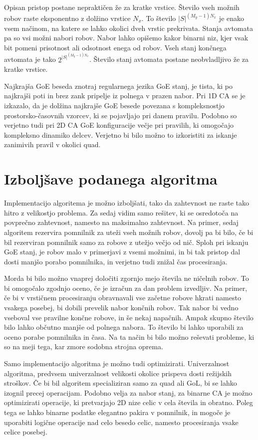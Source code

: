 \documentclass[12pt,a4paper,openany,twoside]{book}
\begin{document}
Opisan pristop postane nepraktičen že za kratke vrstice.
Število vseh možnih robov raste eksponentno z dolžino vrstice \(N_x\).
To število \(|S|^{(M_y-1)N_x}\) je enako vsem načinom,
na katere se lahko okolici dveh vrstic prekrivata.
Stanja avtomata pa so vsi možni nabori robov.
Nabor lahko opišemo kakor binarni niz, kjer vsak bit pomeni
prisotnost ali odsotnost enega od robov.
Vseh stanj končnega avtomata je tako \(2^{|S|^{(M_y-1)N_x}}\).
Število stanj avtomata postane neobvladljivo že za kratke vrstice.

Najkrajša GoE beseda znotraj regularnega jezika GoE stanj, je tista,
ki po najkrajši poti in brez zank pripelje iz polnega v prazen nabor.
Pri 1D CA se je izkazalo, da je dolžina najkrajše GoE besede povezana s kompleksnostjo
prostorsko-časovnih vzorcev, ki se pojavljajo pri danem pravilu.
Podobno so verjetno tudi pri 2D CA GoE konfiguracije večje pri pravilih,
ki omogočajo kompleksno dinamiko delcev. Verjetno bi bilo možno to izkoristiti
za iskanje zanimivih pravil v okolici quad.

\section{Izboljšave podanega algoritma}

Implementacijo algoritema je možno izboljšati, tako da zahtevnost
ne raste tako hitro z velikostjo problema.
Za sedaj vidim samo rešitev, ki se osredotoča na povprečno zahtevnost, namesto na maksimalno zahtevnost.
Na primer, sedaj algoritem rezervira pomnilnik za uteži vseh možnih robov,
dovolj pa bi bilo, če bi bil rezerviran pomnilnik samo za robove z utežjo večjo od nič.
Sploh pri iskanju GoE stanj, je robov malo v primerjavi z vsemi možnimi,
in bi tak pristop dal dosti manjšo porabo pomnilnika,
in verjetno tudi znižal čas procesiranja.

Morda bi bilo možno vnaprej določiti zgornjo mejo števila ne ničelnih robov.
To bi omogočalo zgodnjo oceno, če je izračun za dan problem izvedljiv.
Na primer, če bi v vrstičnem procesiranju obravnavali vse začetne robove hkrati
namesto vsakega posebej, bi dobili prevelik nabor končnih robov.
Tak nabor bi vedno vseboval vse pravilne končne robove, in še nekaj napačnih.
Ampak skupno število bilo lahko občutno manjše od polnega nabora.
To število bi lahko uporabili za oceno porabe pomnilnika in časa.
Na ta način bi bilo možno reševati probleme, ki so na meji tega,
kar zmore sodobna strojna oprema.

Samo implementacijo algoritma je možno tudi optimizirati.
Univerzalnost algoritma, predvsem univerzalnost velikosti okolice
prispeva dosti režijskih stroškov. Če bi bil algoritem specializiran
samo za quad ali GoL, bi se lahko izognil precej operacijam.
Podobno velja za nabor stanj, za binarne CA je možno optimizirati
operacije, ki pretvarjajo 2D nize celic v cela števila in obratno.
Poleg tega se lahko binarne podatke elegantno pakira v pomnilnik,
in mogoče je uporabiti logične operacije nad celo besedo celic,
namesto procesiranja vsake celice posebej.
\end{document}
